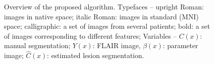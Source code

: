 \documentclass{article}
\begin{document}
    \begin{figure}
      \centering
      \scalebox{0.5}{}
      \caption{Overview of the proposed algorithm. Typefaces -- upright Roman: images in native space; italic Roman: images in standard (MNI) space; calligraphic: a set of images from several patients; bold: a set of images corresponding to different features; Variables -- $C(x)$: manual segmentation; $Y(x)$: FLAIR image, $\beta(x)$: parameter image; $\hat{C}(x)$: estimated lesion segmentation.}
    \end{figure}
\end{document}
